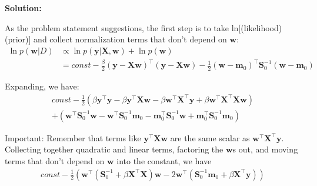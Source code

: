 \documentclass[12pt,letterpaper]{article}
\begin{document}
\begin{enumerate}
\newpage

\textbf{Solution:}

As the problem statement suggestions, the first step is to take ln[(likelihood)(prior)] and collect normalization terms that don't depend on $\mathbf{w}$:
\begin{align}
\ln p(\mathbf{w} | D) &\propto \ln p(\mathbf{y} |\mathbf{X}, \mathbf{w}) +\ln p(\mathbf{w}) \\
&=\mathit{const} -\frac{\beta}{2} (\mathbf{y} - \mathbf{X} \mathbf{w})^\top (\mathbf{y} - \mathbf{X} \mathbf{w})  -\frac{1}{2} (\mathbf{w} - \mathbf{m}_0)^\top \mathbf{S}_0^{-1} (\mathbf{w} - \mathbf{m}_0)
\end{align}

Expanding, we have:
%
\begin{align}
\mathit{const} -\frac{1}{2}\left( \beta \mathbf{y}^\top \mathbf{y} - \beta \mathbf{y}^\top\mathbf{Xw}
- \beta\mathbf{w}^\top\mathbf{X}^\top\mathbf{y} + \beta\mathbf{w}^\top\mathbf{X}^\top \mathbf{Xw} \right)\\
+ \left( \mathbf{w}^\top \mathbf{S}_0^{-1}\mathbf{w} - \mathbf{w}^\top \mathbf{S}_0^{-1}\mathbf{m}_0 - \mathbf{m}_0^\top \mathbf{S}_0^{-1}\mathbf{w} + \mathbf{m}_0^\top \mathbf{S}_0^{-1}\mathbf{m}_0 \right)
\end{align}



Important: Remember that terms like $\mathbf{y}^\top\mathbf{Xw}$ are the same scalar as $\mathbf{w}^\top\mathbf{X}^\top\mathbf{y}$.
Collecting together quadratic and linear terms, factoring the $\mathbf{w}$s out, and moving terms that
don't depend on $\mathbf{w}$ into the constant, we have
%
\begin{align}
\mathit{const}-\frac{1}{2}\left( \mathbf{w}^\top(\mathbf{S}_0^{-1} + \beta \mathbf{X}^\top \mathbf{X}) \mathbf{w} 
-2\mathbf{w}^\top (\mathbf{S}_0^{-1}\mathbf{m}_0 + \beta \mathbf{X}^\top \mathbf{y}) \right)
\end{align}


\end{enumerate}
\end{document}

